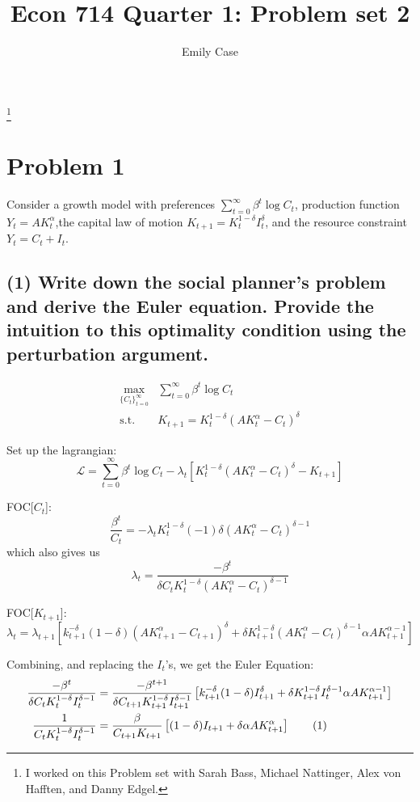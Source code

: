 \documentclass[]{article}
\title{Econ 714 Quarter 1: Problem set 2 }
\author{Emily Case}
\newcommand\blfootnote[1]{%
	\begingroup
	\renewcommand\thefootnote{}\footnote{#1}%
	\addtocounter{footnote}{-1}%
	\endgroup
}
\newcommand{\sumti}{\sum\limits_{t=0}^\infty} %
\newcommand\numberthis{\addtocounter{equation}{1}\tag{\theequation}} %
\begin{document}
	
	\maketitle
	
	\blfootnote{I worked on this Problem set with Sarah Bass, Michael Nattinger, Alex von Hafften, and Danny Edgel.} 



\section*{Problem 1}
Consider a growth model with preferences $\sumti \beta^t\log C_t$, production function $Y_t=AK_t^\alpha$,the capital law of motion $K_{t+1}=K_{t}^{1-\delta}I_t^\delta$, and the resource constraint $Y_t=C_t+I_t$.

\subsection*{(1) Write down the social planner’s problem and derive the Euler equation. Provide the intuition to this optimality condition using the perturbation argument.} 

\begin{align*}
\max_{\{C_t\}_{t=0}^\infty} & \sumti \beta^t \log C_t 
\\
\text{s.t.}\; & K_{t+1}
 = K_t^{1-\delta}(AK_t^\alpha-C_t)^\delta
\end{align*}


Set up the lagrangian:
\[ \mathcal{L} = 
\sumti \beta^t \log C_t -\lambda_t 
[K_t^{1-\delta}(AK_t^\alpha -C_t)^\delta -K_{t+1} ]\]

FOC[$C_t$]:
\[\frac{\beta^t}{C_t} = -\lambda_t K_t^{1-\delta}(-1)\delta(AK_t^\alpha-C_t)^{\delta-1}
\]
which also gives us 
\[ \lambda_t = \frac{-\beta^t}{\delta C_t K_t^{1-\delta}(AK_t^\alpha-C_t)^{\delta-1}}\]

FOC[$K_{t+1}$]:
\[\lambda_t = \lambda_{t+1} [
k_{t+1}^{-\delta}(1-\delta)(AK_{t+1}^\alpha-C_{t+1})^\delta + 
\delta K_{t+1}^{1-\delta}(AK_t^\alpha -C_t)^{\delta-1}\alpha AK_{t+1}^{\alpha-1}]
\]


Combining, and replacing the $I_t$'s, we get the Euler Equation: 
\begin{align*}
\frac{-\beta^t}{\delta C_t K_t^{1-\delta}I_t^{\delta-1}} 
& = \frac{-\beta^{t+1}}{\delta C_{t+1} K_{t+1}^{1-\delta}I_{t+1}^{\delta-1}} 
\left[ k_{t+1}^{-\delta}(1-\delta)I_{t+1}^\delta + 
\delta K_{t+1}^{1-\delta}I_t^{\delta-1}\alpha AK_{t+1}^{\alpha-1}\right] 
\\
\frac{1}{C_tK_t^{1-\delta}I_t^{\delta-1}}
& = \frac{\beta}{C_{t+1}K_{t+1}}
\left[ (1-\delta)I_{t+1}+\delta\alpha A K_{t+1}^\alpha \right]
\numberthis \label{euler}
\end{align*}
\end{document}

